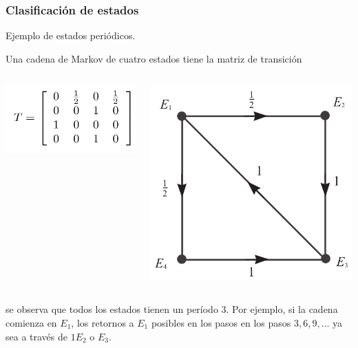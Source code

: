 \documentclass[spanish]{beamer}
\begin{document}
\begin{frame}
\frametitle{Clasificación de estados}
Ejemplo de estados periódicos.

Una cadena de Markov de cuatro estados tiene la matriz de transición 
\begin{columns}
\begin{center}
\includegraphics[scale=0.3]{im31}
\end{center}
\begin{center}
\includegraphics[scale=0.2]{im32}
\end{center}
\end{columns}

se observa que todos los estados tienen un período 3. Por ejemplo, si la cadena comienza en $E_{1}$, los retornos a $E_1$ posibles en los pasos en los pasos $3, 6, 9,\ldots$ ya sea a través de $1E_2$ o $E_3$.

\end{frame}
\end{document}
